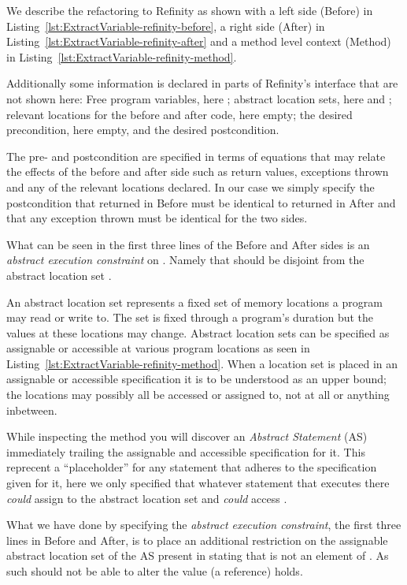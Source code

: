 We describe the refactoring to Refinity as shown with a left side (Before) in Listing~\ref{lst:ExtractVariable-refinity-before},
a right side (After) in Listing~\ref{lst:ExtractVariable-refinity-after} and a method level context (Method) in Listing~\ref{lst:ExtractVariable-refinity-method}.

Additionally some information is declared in parts of Refinity's interface that are not shown here:
Free program variables, here ; abstract location sets, here  and ; relevant locations for the before and after code, here empty;
the desired precondition, here empty, and the desired postcondition.

The pre- and postcondition are specified in terms of equations that may relate the effects of the before and after side such as return values, exceptions thrown and any
of the relevant locations declared.
In our case we simply specify the postcondition that  returned in Before must be identical to  returned in After and that any exception thrown must be identical for the two sides.

What can be seen in the first three lines of the Before and After sides is an \emph{abstract execution constraint} on .
Namely that  should be disjoint from the abstract location set .

An abstract location set represents a fixed set of memory locations a program may read or write to. The set is fixed through a program's duration but the values at these locations may change.
Abstract location sets can be specified as assignable or accessible at various program locations as seen in Listing~\ref{lst:ExtractVariable-refinity-method}.
When a location set is placed in an assignable or accessible specification it is to be understood as an upper bound; the locations may possibly all be accessed or assigned to, not at all or
anything inbetween.

While inspecting the method  you will discover an \emph{Abstract Statement} (AS)  immediately trailing the assignable and accessible specification for it.
This reprecent a ``placeholder'' for any statement that adheres to the specification given for it, here we only specified that whatever statement that executes there \emph{could} assign to the abstract
location set  and \emph{could} access .

What we have done by specifying the \emph{abstract execution constraint}, the first three lines in Before and After, is to place an additional restriction on the assignable abstract
location set  of the AS present in  stating that  is not an element of . As such  should not be able to alter the value (a reference)
 holds.

